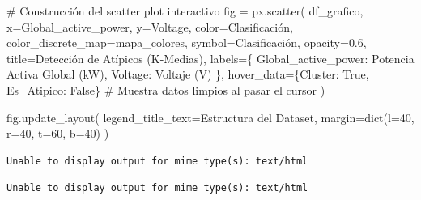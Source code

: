 \documentclass[
  spanish,
  letterpaper,
  DIV=11,
  numbers=noendperiod]{scrreprt}
\newenvironment{Shaded}{}{}
\newcommand{\BuiltInTok}[1]{\textcolor[rgb]{0.84,0.23,0.29}{#1}}
\newcommand{\CommentTok}[1]{\textcolor[rgb]{0.42,0.45,0.49}{#1}}
\newcommand{\DecValTok}[1]{\textcolor[rgb]{0.00,0.36,0.77}{#1}}
\newcommand{\FloatTok}[1]{\textcolor[rgb]{0.00,0.36,0.77}{#1}}
\newcommand{\NormalTok}[1]{\textcolor[rgb]{0.14,0.16,0.18}{#1}}
\newcommand{\OperatorTok}[1]{\textcolor[rgb]{0.14,0.16,0.18}{#1}}
\newcommand{\StringTok}[1]{\textcolor[rgb]{0.01,0.18,0.38}{#1}}
\newcommand{\VariableTok}[1]{\textcolor[rgb]{0.89,0.38,0.04}{#1}}
\begin{document}
\begin{Shaded}
\begin{Highlighting}[numbers=left,,]
\CommentTok{\# Construcción del scatter plot interactivo}
\NormalTok{fig }\OperatorTok{=}\NormalTok{ px.scatter(}
\NormalTok{    df\_grafico,}
\NormalTok{    x}\OperatorTok{=}\StringTok{\textquotesingle{}Global\_active\_power\textquotesingle{}}\NormalTok{,}
\NormalTok{    y}\OperatorTok{=}\StringTok{\textquotesingle{}Voltage\textquotesingle{}}\NormalTok{,}
\NormalTok{    color}\OperatorTok{=}\StringTok{\textquotesingle{}Clasificación\textquotesingle{}}\NormalTok{,}
\NormalTok{    color\_discrete\_map}\OperatorTok{=}\NormalTok{mapa\_colores,}
\NormalTok{    symbol}\OperatorTok{=}\StringTok{\textquotesingle{}Clasificación\textquotesingle{}}\NormalTok{,}
\NormalTok{    opacity}\OperatorTok{=}\FloatTok{0.6}\NormalTok{,}
\NormalTok{    title}\OperatorTok{=}\StringTok{\textquotesingle{}Detección de Atípicos (K{-}Medias)\textquotesingle{}}\NormalTok{,}
\NormalTok{    labels}\OperatorTok{=}\NormalTok{\{}
        \StringTok{\textquotesingle{}Global\_active\_power\textquotesingle{}}\NormalTok{: }\StringTok{\textquotesingle{}Potencia Activa Global (kW)\textquotesingle{}}\NormalTok{,}
        \StringTok{\textquotesingle{}Voltage\textquotesingle{}}\NormalTok{: }\StringTok{\textquotesingle{}Voltaje (V)\textquotesingle{}}
\NormalTok{    \},}
\NormalTok{    hover\_data}\OperatorTok{=}\NormalTok{\{}\StringTok{\textquotesingle{}Cluster\textquotesingle{}}\NormalTok{: }\VariableTok{True}\NormalTok{, }\StringTok{\textquotesingle{}Es\_Atipico\textquotesingle{}}\NormalTok{: }\VariableTok{False}\NormalTok{\} }\CommentTok{\# Muestra datos limpios al pasar el cursor}
\NormalTok{)}

\NormalTok{fig.update\_layout(}
\NormalTok{    legend\_title\_text}\OperatorTok{=}\StringTok{\textquotesingle{}Estructura del Dataset\textquotesingle{}}\NormalTok{,}
\NormalTok{    margin}\OperatorTok{=}\BuiltInTok{dict}\NormalTok{(l}\OperatorTok{=}\DecValTok{40}\NormalTok{, r}\OperatorTok{=}\DecValTok{40}\NormalTok{, t}\OperatorTok{=}\DecValTok{60}\NormalTok{, b}\OperatorTok{=}\DecValTok{40}\NormalTok{)}
\NormalTok{)}
\end{Highlighting}
\end{Shaded}

\begin{verbatim}
Unable to display output for mime type(s): text/html
\end{verbatim}

\begin{verbatim}
Unable to display output for mime type(s): text/html
\end{verbatim}
\end{document}
